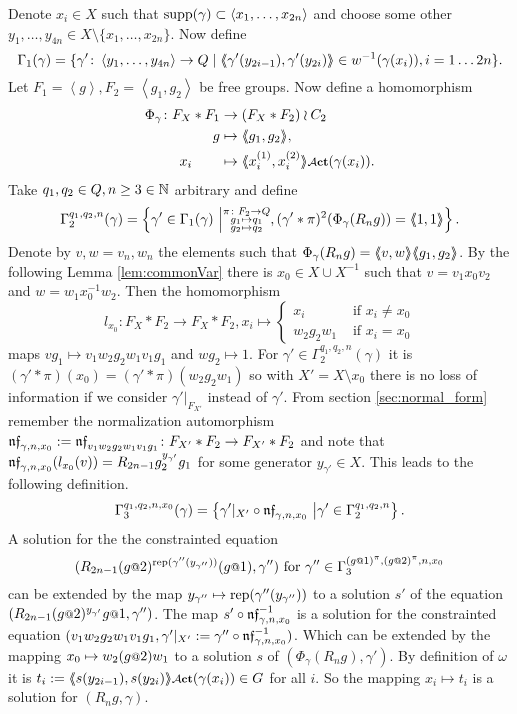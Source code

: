 \documentclass[a4paper,12pt]{article}
\begin{document}
 Denote $x_i\in X$ such that $\textup{supp}(\gamma) \subset \left<x_1,\ldots,x_{2n}\right>$ and choose some 
 other $y_1,\ldots,y_{4n} \in X \setminus \{x_1,\ldots,x_{2n}\}$. 
 Now define
 \[\Gamma_1(\gamma) = \{\gamma' \colon \left< y_1,\ldots ,y_{4n}\right> \to Q \mid \langle\negthickspace\langle\gamma'(y_{2i-1}),\gamma'(y_{2i})\rangle\negthickspace\rangle\in w^{-1}(\gamma(x_i)),i=1\ldots2n\}.\] 
 Let $F_1=\left<g\right>,F_2=\left<g_1,g_2\right>$ be free groups. 
 Now define a homomorphism  
 \begin{align*}
  \Phi_{\gamma}\colon F_X*F_1 &\to (F_X*F_2)\wr C_2 \\ g&\mapsto \pair{g_1,g_2},\\ x_i\qquad &\mapsto \pair{x_i^{(1)},x_i^{(2)}}\act(\gamma(x_i)).
 \end{align*}
Take $q_1,q_2 \in Q,n\geq3\in \mathbb{N}$ arbitrary and define
 \[\Gamma_2^{q_1,q_2,n}(\gamma) = \left\{\gamma'\in \Gamma_1(\gamma) \ \middle \vert \substack{\pi\colon F_2\to Q\\
										g_1\mapsto q_1 \\
										g_2\mapsto q_2 }, (\gamma'*\pi)^2(\Phi_\gamma(R_ng))=\langle\negthickspace\langle1,1\rangle\negthickspace\rangle\right\}.\] 
 Denote by $v,w=v_n,w_n$ the elements such that $\Phi_\gamma(R_ng)=\langle\negthickspace\langle v,w\rangle\negthickspace\rangle\langle\negthickspace\langle g_1,g_2\rangle\negthickspace\rangle$. By the following Lemma \ref{lem:commonVar} there is 
 $x_0 \in X\cup X^{-1}$ such that $v=v_1x_0v_2$ and $w=w_1x_0^{-1}w_2$. Then the homomorphism
 \[l_{x_0}\colon F_X*F_2\to F_X*F_2, x_i \mapsto \begin{cases}
						x_i &\text{ if } x_i\neq {x_0} \\
						w_2g_2w_1 &\text{ if }x_i= {x_0} 
                                             \end{cases}\]
 maps $vg_1 \mapsto v_1w_2g_2w_1v_1g_1$ and $wg_2\mapsto 1$. 
 For $\gamma'\in \Gamma_2^{q_1,q_2,n}(\gamma)$ it is $(\gamma'*\pi)(x_0)=({\gamma'*\pi})(w_2g_2w_1)$ so with $X'=X\setminus x_0$ there is no loss of information if 
 we consider $\gamma'|_{F_{X'}}$ instead of $\gamma'$.
 From section \ref{sec:normal_form} remember the normalization 
 automorphism $\mathfrak{nf}_{\gamma,n,x_0}:=\mathfrak{nf}_{v_1w_2g_2w_1v_1g_1}\colon F_{X'}*F_2 \to F_{X'}*F_2$
  and note that
 $\mathfrak{nf}_{\gamma,n,x_0}(l_{x_0}(v))=R_{2n-1}g_2^{{y_{\gamma'}}}g_1$ for some generator ${y_{\gamma'}}\in X$.
 This leads to the following definition.
 \[\Gamma_3^{q_1,q_2,n,x_0}(\gamma) = \left\{\gamma'|_{X'} \circ \mathfrak{nf}_{\gamma,n,x_0} \ \middle \vert \gamma' \in \Gamma_2^{q_1,q_2,n} \right\}.\] 
 A solution for the the constrainted equation
 \[(R_{2n-1}(g\at2)^{\textup{rep}(\gamma''({y_{\gamma''}}))}(g\at1),\gamma'')\textup{ for }\gamma'' \in \Gamma_3^{(g\at{1})^\pi,(g\at{2})^\pi,n,x_0}\]
 can be 
 extended by the map ${y_{\gamma''}}\mapsto \textup{rep}(\gamma''({y_{\gamma''}}))$ to a solution $s'$ 
 of the equation $(R_{2n-1} (g\at{2})^{{y_{\gamma'}}} g\at{1},\gamma'')$. The map $s'\circ \mathfrak{nf}_{\gamma,n,x_0}^{-1}$ 
 is a solution for the constrainted equation $(v_1w_2g_2w_1v_1g_1,\gamma'|_{X'}:=\gamma'' \circ \mathfrak{nf}_{\gamma,n,x_0}^{-1})$.
 Which can be extended by the mapping $x_0\mapsto w_2(g\at{2})w_1$ to a solution $s$ of $(\Phi_\gamma(R_n g),\gamma')$.
 By definition of $\omega$ it is $t_i:=\pair{s(y_{2i-1}),s(y_{2i})}\act(\gamma(x_i)) \in G$ for all $i$. So the mapping $x_i\mapsto t_i$ is a solution for $(R_ng,\gamma)$.
 
\end{document}
